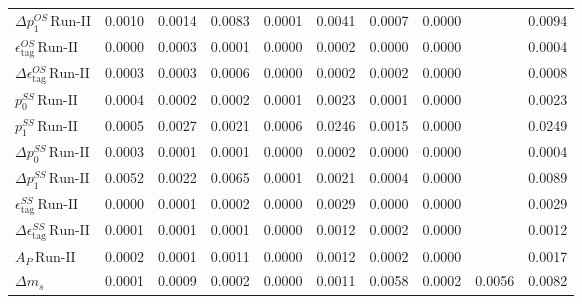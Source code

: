 \begin{tabular}{l  c  c  c  c  c  c  c  c  | c }
$\Delta p_{1}^{OS} \, \text{Run-II}$ & 0.0010 & 0.0014 & 0.0083 & 0.0001 & 0.0041 & 0.0007 & 0.0000 &  & 0.0094 \\ 
$\epsilon_{\text{tag}}^{OS} \, \text{Run-II}$ & 0.0000 & 0.0003 & 0.0001 & 0.0000 & 0.0002 & 0.0000 & 0.0000 &  & 0.0004 \\ 
$\Delta \epsilon_{\text{tag}}^{OS} \, \text{Run-II}$ & 0.0003 & 0.0003 & 0.0006 & 0.0000 & 0.0002 & 0.0002 & 0.0000 &  & 0.0008 \\ 
$p_{0}^{SS} \, \text{Run-II}$ & 0.0004 & 0.0002 & 0.0002 & 0.0001 & 0.0023 & 0.0001 & 0.0000 &  & 0.0023 \\ 
$p_{1}^{SS} \, \text{Run-II}$ & 0.0005 & 0.0027 & 0.0021 & 0.0006 & 0.0246 & 0.0015 & 0.0000 &  & 0.0249 \\ 
$\Delta p_{0}^{SS} \, \text{Run-II}$ & 0.0003 & 0.0001 & 0.0001 & 0.0000 & 0.0002 & 0.0000 & 0.0000 &  & 0.0004 \\ 
$\Delta p_{1}^{SS} \, \text{Run-II}$ & 0.0052 & 0.0022 & 0.0065 & 0.0001 & 0.0021 & 0.0004 & 0.0000 &  & 0.0089 \\ 
$\epsilon_{\text{tag}}^{SS} \, \text{Run-II}$ & 0.0000 & 0.0001 & 0.0002 & 0.0000 & 0.0029 & 0.0000 & 0.0000 &  & 0.0029 \\ 
$\Delta \epsilon_{\text{tag}}^{SS} \, \text{Run-II}$ & 0.0001 & 0.0001 & 0.0001 & 0.0000 & 0.0012 & 0.0002 & 0.0000 &  & 0.0012 \\ 
$A_{P} \, \text{Run-II}$ & 0.0002 & 0.0001 & 0.0011 & 0.0000 & 0.0012 & 0.0002 & 0.0000 &  & 0.0017 \\ 
$\Delta m_{s}$ & 0.0001 & 0.0009 & 0.0002 & 0.0000 & 0.0011 & 0.0058 & 0.0002 & 0.0056 & 0.0082 \\ 
\hline
\hline
\end{tabular}
